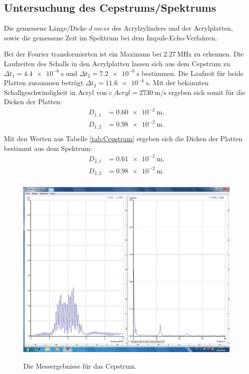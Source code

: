 \subsection{Untersuchung des Cepstrums/Spektrums}

\begin{table}
	\centering
	\caption{Die gemessene Länge/Dicke $d_.{mess}$ des Acrylzylinders und der Acrylplatten, sowie die gemessene Zeit im Spektrum bei dem Impuls-Echo-Verfahren.}
	
	\label{tab:Cepstrum}
\end{table}

\noindent Bei der Fourier transformierten ist ein Maximum bei $\SI{2.27}{\mega\hertz}$ zu erkennen.
Die Laufzeiten des Schalls in den Acrylplatten lassen sich aus dem Cepstrum zu $\Delta t_1=\SI{4.4e-6}{\second}$ und $\Delta t_2=\SI{7.2e-6}{\second}$ bestimmen. Die Laufzeit für beide Platten zusammen beträgt $\Delta t_2=\SI{11.6e-6}{\second}$. 
Mit der bekannten Schallgeschwindigkeit in Acryl von $c_.{Acryl}=\SI{2730}{\meter\per\second}$ \cite{cAcryl} ergeben sich somit für die Dicken der Platten:
\begin{align*}
D_{1,1}&=\SI{0.60e-2}{\meter}\text{,}\\
D_{1,2}&=\SI{0.98e-2}{\meter}\text{.}\\
\end{align*}
Mit den Werten aus Tabelle \ref{tab:Cepstrum} ergeben sich die Dicken der Platten bestimmt aus dem Spektrum:
\begin{align*}
D_{2,1}&=\SI{0.61e-2}{\meter}\text{,}\\
D_{2,2}&=\SI{0.98e-2}{\meter}\text{.}\\
\end{align*}

\begin{figure}
	\centering
	\caption{Die Messergebnisse für das Cepstrum.}
	\includegraphics[width=\linewidth-70pt,height=\textheight-70pt,keepaspectratio]{content/images/CEPSTRUM.jpg}
	\label{fig:Cepstrum}
\end{figure}

